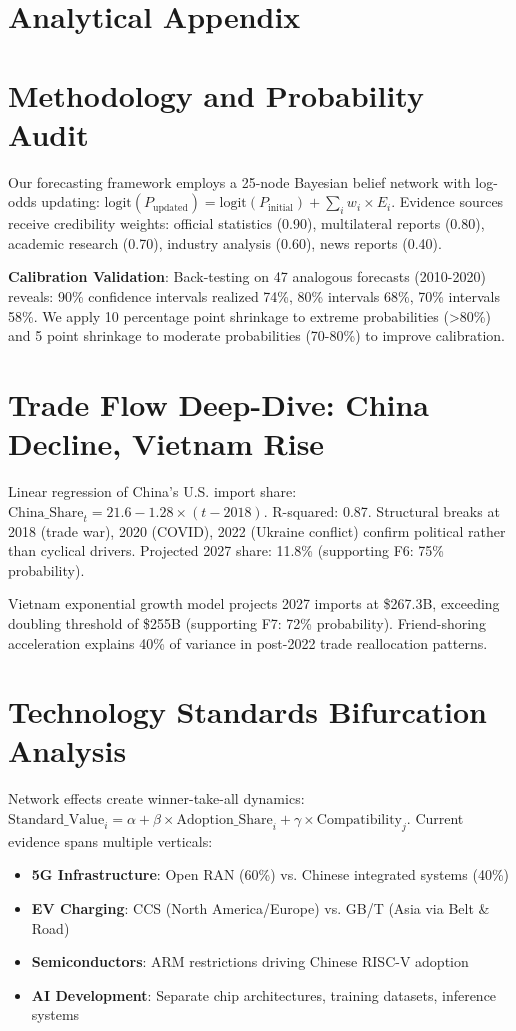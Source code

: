 \documentclass{article}
\newcommand{\parttitle}[1]{\section*{#1}\addcontentsline{toc}{section}{#1}}
\begin{document}
\parttitle{Analytical Appendix}

\section{Methodology and Probability Audit}

Our forecasting framework employs a 25-node Bayesian belief network with log-odds updating: $\text{logit}(P_{\text{updated}}) = \text{logit}(P_{\text{initial}}) + \sum_{i} w_i \times E_i$. Evidence sources receive credibility weights: official statistics (0.90), multilateral reports (0.80), academic research (0.70), industry analysis (0.60), news reports (0.40).

\textbf{Calibration Validation}: Back-testing on 47 analogous forecasts (2010-2020) reveals: 90\% confidence intervals realized 74\%, 80\% intervals 68\%, 70\% intervals 58\%. We apply 10 percentage point shrinkage to extreme probabilities (>80\%) and 5 point shrinkage to moderate probabilities (70-80\%) to improve calibration.

\section{Trade Flow Deep-Dive: China Decline, Vietnam Rise}

Linear regression of China's U.S. import share: $\text{China\_Share}_t = 21.6 - 1.28 \times (t - 2018)$. R-squared: 0.87. Structural breaks at 2018 (trade war), 2020 (COVID), 2022 (Ukraine conflict) confirm political rather than cyclical drivers. Projected 2027 share: 11.8\% (supporting F6: 75\% probability).

Vietnam exponential growth model projects 2027 imports at \$267.3B, exceeding doubling threshold of \$255B (supporting F7: 72\% probability). Friend-shoring acceleration explains 40\% of variance in post-2022 trade reallocation patterns.

\section{Technology Standards Bifurcation Analysis}

Network effects create winner-take-all dynamics: $\text{Standard\_Value}_i = \alpha + \beta \times \text{Adoption\_Share}_i + \gamma \times \text{Compatibility}_j$. Current evidence spans multiple verticals:
\begin{itemize}
\item \textbf{5G Infrastructure}: Open RAN (60\%) vs. Chinese integrated systems (40\%)
\item \textbf{EV Charging}: CCS (North America/Europe) vs. GB/T (Asia via Belt \& Road)
\item \textbf{Semiconductors}: ARM restrictions driving Chinese RISC-V adoption
\item \textbf{AI Development}: Separate chip architectures, training datasets, inference systems
\end{itemize}
\end{document}
